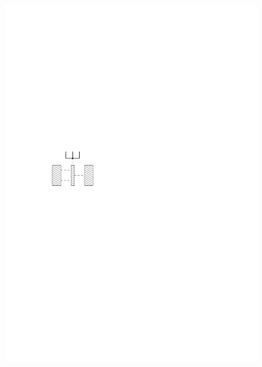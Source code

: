 \documentclass[a4paper]{scrreprt}
\theoremstyle{definition}
\begin{document}
\begin{figure}[h]
            {\includegraphics[scale=.8]{oc3_embed/outgoing/outdeg3}}
        \quad

\end{figure}
\end{document}
